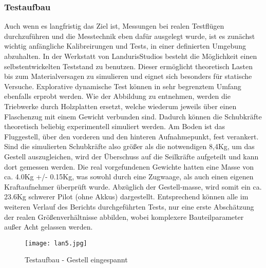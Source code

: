 \subsubsection{Testaufbau}
Auch wenn es langfristig das Ziel ist, Messungen bei realen Testflügen durchzuführen und die Messtechnik eben dafür ausgelegt wurde,
ist es zunächst wichtig anfängliche Kalibreirungen und Tests, in einer definierten Umgebung abzuhalten.
In der Werkstatt von LandurisStudios besteht die Möglichkeit einen selbstentwickelten Teststand zu benutzen.
Dieser ermöglicht theoretisch Lasten bis zum Materialversagen zu simulieren und eignet sich besonders für statische Versuche.
Explorative dynamische Test können in sehr begrenztem Umfang ebenfalls erprobt werden.   Wie der Abbildung zu entnehmen, werden die Triebwerke durch Holzplatten ersetzt,
welche wiederum jeweils über einen Flaschenzug mit einem Gewicht verbunden sind. Dadurch können die Schubkräfte theoretisch beliebig experimentell simuliert werden.
Am Boden ist das Fluggestell, über den vorderen und den hinteren Aufnahmepunkt, fest verankert. Sind die simulierten Schubkräfte also größer als die notwendigen 8,4Kg,
um das Gestell auszugleichen, wird der Überschuss auf die Seilkräfte aufgeteilt und kann dort gemessen werden.
Die real vorgefundenen Gewichte hatten eine Masse von ca. 4.0Kg +/- 0.15Kg, was sowohl durch eine Zugwaage, als auch einen eigenen Kraftaufnehmer überprüft wurde.
Abzüglich der Gestell-masse, wird somit ein ca. 23.6Kg schwerer Pilot (ohne Akkus) dargestellt. Entsprechend können alle im weiteren Verlauf des Berichts durchgeführten Tests,
nur eine erste Abschätzung der realen Größenverhältnisse abbilden, wobei komplexere Bauteilparameter außer Acht gelassen werden.
\begin{figure}[htbp]
    \begin{center}
        \texttt{[image: lan5.jpg]}
        \caption[Testaufbau - Gestell eingespannt (Abbildungsverzeichnis)]{Testaufbau - Gestell eingespannt}
        
        \label{fig:lan5}
    \end{center}
\end{figure}

